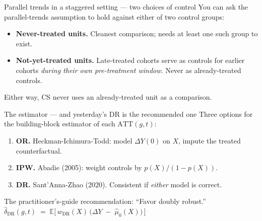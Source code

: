 \documentclass[aspectratio=169,11pt]{beamer}
\begin{document}
\begin{frame}{Parallel trends in a staggered setting --- two choices of control}
\vspace{0.5em}
You can ask the parallel-trends assumption to hold against either of two control groups:

\vspace{0.6em}
\begin{itemize}
  \item \textbf{Never-treated units.} \;Cleanest comparison; needs at least one such group to exist.
  \item \textbf{Not-yet-treated units.} \;Late-treated cohorts serve as controls for earlier cohorts \textit{during their own pre-treatment window}. \;Never as already-treated controls.
\end{itemize}

\vspace{0.7em}
Either way,  \;CS never uses an already-treated unit as a comparison.

\vspace{0.6em}
\end{frame}

\begin{frame}{The estimator --- and yesterday's DR is the recommended one}
Three options for the building-block estimator of each $\text{ATT}(g,t)$:
\begin{enumerate}\small
  \item \textbf{OR.} \;Heckman-Ichimura-Todd: model $\Delta Y(0)$ on $X$, impute the treated counterfactual.
  \item \textbf{IPW.} \;Abadie (2005): weight controls by $p(X)/(1-p(X))$.
  \item \textbf{DR.} \;Sant'Anna-Zhao (2020). \;Consistent if \textit{either} model is correct.
\end{enumerate}
\begin{block}{The practitioner's-guide recommendation: ``Favor doubly robust.''}
\centering
$\widehat{\delta}_{\text{DR}}(g,t) \;=\; \mathbb{E}\Big[\, w_{\text{DR}}(X)\,\big(\Delta Y \;-\; \widehat{\mu}_0(X)\big) \,\Big]$
\end{block}
\end{frame}
\end{document}
